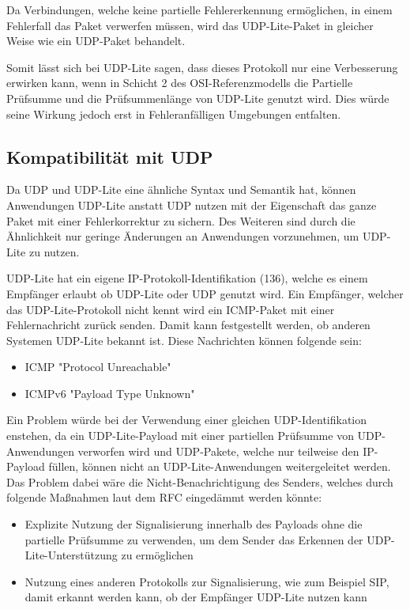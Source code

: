 \documentclass{template}
\begin{document}
Da Verbindungen, welche keine partielle Fehlererkennung ermöglichen,
in einem Fehlerfall das Paket verwerfen müssen, wird das UDP-Lite-Paket
in gleicher Weise wie ein UDP-Paket behandelt.

Somit lässt sich bei UDP-Lite sagen, dass dieses Protokoll nur eine
Verbesserung erwirken kann, wenn in Schicht 2 des OSI-Referenzmodells
die Partielle Prüfsumme und die Prüfsummenlänge von UDP-Lite genutzt wird.
Dies würde seine Wirkung jedoch erst in Fehleranfälligen
Umgebungen entfalten.


\subsection{Kompatibilität mit UDP}

Da UDP und UDP-Lite eine ähnliche Syntax und Semantik hat,
können Anwendungen UDP-Lite anstatt UDP nutzen mit der
Eigenschaft das ganze Paket mit einer Fehlerkorrektur zu
sichern. Des Weiteren sind durch die Ähnlichkeit nur geringe
Änderungen an Anwendungen vorzunehmen, um UDP-Lite zu nutzen.

UDP-Lite hat ein eigene IP-Protokoll-Identifikation (136),
welche es einem Empfänger erlaubt ob UDP-Lite oder UDP genutzt wird.
Ein Empfänger, welcher das UDP-Lite-Protokoll nicht kennt wird ein
ICMP-Paket mit einer Fehlernachricht zurück senden.
Damit kann festgestellt werden, ob anderen Systemen UDP-Lite bekannt ist.
Diese Nachrichten können folgende sein:
\begin{itemize}
\item ICMP "Protocol Unreachable"
\item ICMPv6 "Payload Type Unknown"
\end{itemize}

Ein Problem würde bei der Verwendung einer gleichen UDP-Identifikation
enstehen, da ein UDP-Lite-Payload mit einer partiellen Prüfsumme
von UDP-Anwendungen verworfen wird und UDP-Pakete, welche nur teilweise
den IP-Payload füllen, können nicht an UDP-Lite-Anwendungen weitergeleitet werden.
Das Problem dabei wäre die Nicht-Benachrichtigung des Senders,
welches durch folgende Maßnahmen laut dem RFC eingedämmt werden könnte:
\begin{itemize}
\item Explizite Nutzung der Signalisierung innerhalb des Payloads
		ohne die partielle Prüfsumme zu verwenden, um dem Sender das
		Erkennen der UDP-Lite-Unterstützung zu ermöglichen
\item Nutzung eines anderen Protokolls zur Signalisierung,
		wie zum Beispiel SIP, damit erkannt werden kann,
		ob der Empfänger UDP-Lite nutzen kann
\end{itemize}
\end{document}
